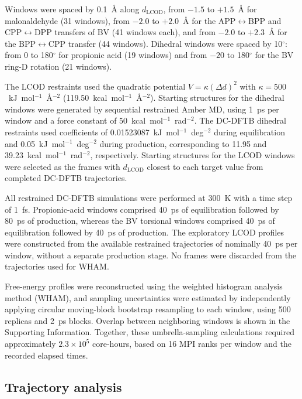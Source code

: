 Windows were spaced by 0.1~\AA{} along $d_{\mathrm{LCOD}}$, from $-1.5$ to $+1.5$~\AA{} for malonaldehyde (31 windows), from $-2.0$ to $+2.0$~\AA{} for the APP$\leftrightarrow$BPP and CPP$\leftrightarrow$DPP transfers of BV (41 windows each), and from $-2.0$ to $+2.3$~\AA{} for the BPP$\leftrightarrow$CPP transfer (44 windows). Dihedral windows were spaced by 10$^\circ$: from 0 to 180$^\circ$ for propionic acid (19 windows) and from $-20$ to 180$^\circ$ for the BV ring-D rotation (21 windows).

The LCOD restraints used the quadratic potential $V=\kappa(\Delta d)^2$ with $\kappa=500$~kJ~mol$^{-1}$~\AA$^{-2}$ (119.50~kcal~mol$^{-1}$~\AA$^{-2}$). Starting structures for the dihedral windows were generated by sequential restrained Amber MD, using 1~ps per window and a force constant of 50~kcal~mol$^{-1}$~rad$^{-2}$. The DC-DFTB dihedral restraints used coefficients of 0.01523087~kJ~mol$^{-1}$~deg$^{-2}$ during equilibration and 0.05~kJ~mol$^{-1}$~deg$^{-2}$ during production, corresponding to 11.95 and 39.23~kcal~mol$^{-1}$~rad$^{-2}$, respectively. Starting structures for the LCOD windows were selected as the frames with $d_{\mathrm{LCOD}}$ closest to each target value from completed DC-DFTB trajectories.

All restrained DC-DFTB simulations were performed at 300~K with a time step of 1~fs. Propionic-acid windows comprised 40~ps of equilibration followed by 80~ps of production, whereas the BV torsional windows comprised 40~ps of equilibration followed by 40~ps of production. The exploratory LCOD profiles were constructed from the available restrained trajectories of nominally 40~ps per window, without a separate production stage. No frames were discarded from the trajectories used for WHAM.

Free-energy profiles were reconstructed using the weighted histogram analysis method (WHAM),\cite{kumarMultidimensionalFreeenergyCalculations1995} and sampling uncertainties were estimated by independently applying circular moving-block bootstrap resampling to each window, using 500 replicas and 2~ps blocks. Overlap between neighboring windows is shown in the Supporting Information. Together, these umbrella-sampling calculations required approximately $2.3\times10^5$ core-hours, based on 16 MPI ranks per window and the recorded elapsed times.

\subsection{Trajectory analysis}
\label{sec:traj-analysis}

